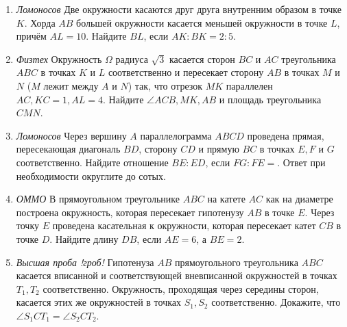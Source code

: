 


\clearpage
\pagestyle{empty}
\begin{enumerate}
    \item \textit{Ломоносов} Две окружности касаются друг друга внутренним образом в точке $K$. Хорда $AB$ большей окружности касается меньшей окружности в точке $L$, причём $AL=10$. Найдите $BL$, если $AK:BK=2:5$.
    \item \textit{Физтех} Окружность $\Omega$ радиуса $\sqrt{3}$ касается сторон $BC$ и $AC$ треугольника $ABC$ в точках $K$ и $L$ соответственно и пересекает сторону $AB$ в точках $M$ и $N$ ($M$ лежит между $A$ и $N$) так, что отрезок $MK$ параллелен $AC, KC=1,AL=4$. Найдите $\angle ACB, MK, AB$ и площадь треугольника $CMN$.
    \item \textit{Ломоносов} Через вершину $A$ параллелограмма $ABCD$ проведена прямая, пересекающая диагональ $BD$, сторону $CD$ и прямую $BC$ в точках $E, F$ и $G$ соответственно. Найдите отношение $BE:ED$, если $FG:FE=$. Ответ при необходимости округлите до сотых.
    \item \textit{ОММО} В прямоугольном треугольнике $ABC$ на катете $AC$ как на диаметре построена окружность, которая пересекает гипотенузу $AB$ в точке $E$. Через точку $E$ проведена касательная к окружности, которая пересекает катет $CB$ в точке $D$. Найдите длину $DB$, если $AE=6$, а $BE=2$.
    \item \textit{Высшая проба !гроб!} Гипотенуза $AB$ прямоугольного треугольника $ABC$ касается вписанной и соответствующей вневписанной окружностей в точках $T_1, T_2$ соответственно. Окружность, проходящая через середины сторон, касается этих же окружностей в точках $S_1, S_2$ соответственно. Докажите, что $\angle S_1CT_1=\angle S_2CT_2$.
\end{enumerate}
